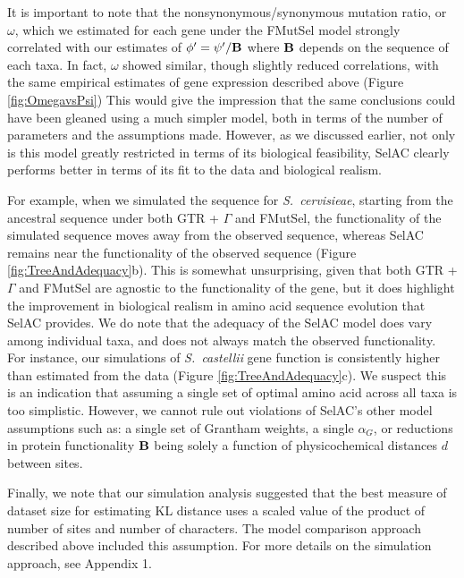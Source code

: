 \documentclass[12pt,letterpaper,fleqn]{article}
\newcommand{\Func}{\ensuremath{\text{\textbf{B}}}\xspace}
\newcommand{\selac}{SelAC\xspace}
\newcommand{\alphag}{\ensuremath{\alpha_G}\xspace}
\newcommand{\phiprime}{\ensuremath{\phi^\prime}\xspace}
\newcommand{\psiprime}{\ensuremath{\psi^\prime}\xspace}
\begin{document}
It is important to note that the nonsynonymous/synonymous mutation ratio, or $\omega$, which we estimated for each gene under the FMutSel model strongly correlated with our estimates of $\phiprime = \psiprime/\Func$ where $\Func$ depends on the sequence of each taxa.
In fact, $\omega$ showed similar, though slightly reduced correlations, with the same empirical estimates of gene expression described above (Figure \ref{fig:OmegavsPsi})
This would give the impression that the same conclusions could have been gleaned using a much simpler model, both in terms of the number of parameters and the assumptions made.
However, as we discussed earlier, not only is this model greatly restricted in terms of its biological feasibility, \selac clearly performs better in terms of its fit to the data and biological realism.

For example, when we simulated the sequence for \emph{S.~cervisieae}, starting from the ancestral sequence under both GTR + $\Gamma$ and FMutSel, the functionality of the simulated sequence moves away from the observed sequence, whereas SelAC remains near the functionality of the observed sequence (Figure \ref{fig:TreeAndAdequacy}b).
This is somewhat unsurprising, given that both GTR + $\Gamma$ and FMutSel are agnostic to the functionality of the gene, but it does highlight the improvement in biological realism in amino acid sequence evolution that \selac provides.
We do note that the adequacy of the \selac model does vary among individual taxa, and does not always match the observed functionality.
For instance, our simulations of \emph{S.~castellii} gene function is consistently higher than estimated from the data (Figure \ref{fig:TreeAndAdequacy}c).
We suspect this is an indication that assuming a single set of optimal amino acid across all taxa is too simplistic.
However, we cannot rule out violations of \selac's other model assumptions such as: a single set of Grantham weights, a single $\alphag$, or reductions in protein functionality \Func being solely a function of physicochemical distances $d$  between sites.

Finally, we note that our simulation analysis suggested that the best measure of dataset size for estimating KL distance uses a scaled value of the product of number of sites and number of characters.
The model comparison approach described above included this assumption.
For more details on the simulation approach, see Appendix 1.
\end{document}
